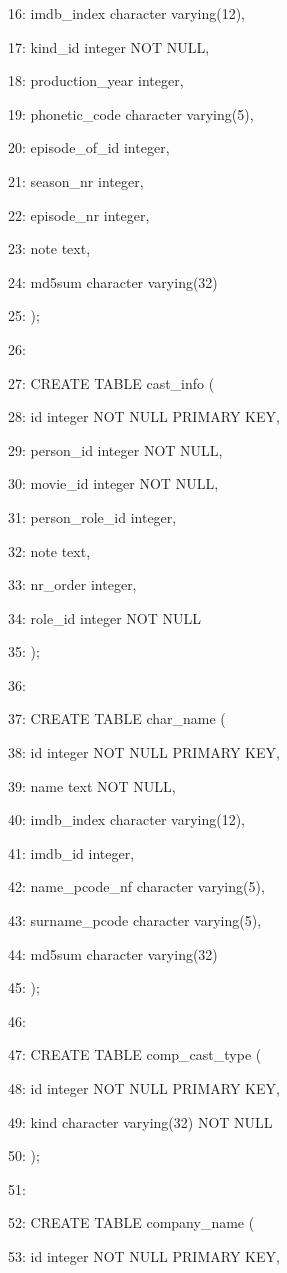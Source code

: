 \documentclass[11pt,a4paper]{article}
\begin{document}
16:     imdb\_index character varying(12),

17:     kind\_id integer NOT NULL,

18:     production\_year integer,

19:     phonetic\_code character varying(5),

20:     episode\_of\_id integer,

21:     season\_nr integer,

22:     episode\_nr integer,

23:     note text,

24:     md5sum character varying(32)

25: );

26:

27: CREATE TABLE cast\_info (

28:     id integer NOT NULL PRIMARY KEY,

29:     person\_id integer NOT NULL,

30:     movie\_id integer NOT NULL,

31:     person\_role\_id integer,

32:     note text,

33:     nr\_order integer,

34:     role\_id integer NOT NULL

35: );

36:

37: CREATE TABLE char\_name (

38:     id integer NOT NULL PRIMARY KEY,

39:     name text NOT NULL,

40:     imdb\_index character varying(12),

41:     imdb\_id integer,

42:     name\_pcode\_nf character varying(5),

43:     surname\_pcode character varying(5),

44:     md5sum character varying(32)

45: );

46:

47: CREATE TABLE comp\_cast\_type (

48:     id integer NOT NULL PRIMARY KEY,

49:     kind character varying(32) NOT NULL

50: );

51:

52: CREATE TABLE company\_name (

53:     id integer NOT NULL PRIMARY KEY,
\end{document}
